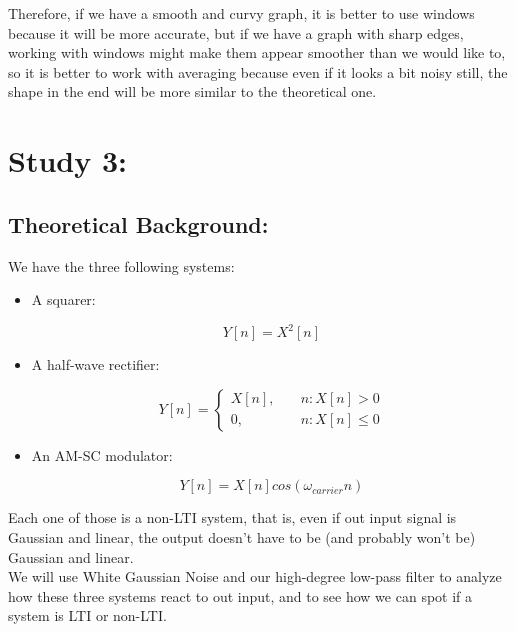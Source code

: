 \documentclass[a4paper,11pt]{article}
\begin{document}
Therefore, if we have a smooth and curvy graph, it is better to use windows
because it will be more accurate, but if we have a graph with sharp edges,
working with windows might make them appear smoother than we would like to,
so it is better to work with averaging because even if it looks a bit noisy
still, the shape in the end will be more similar to the theoretical one.

\newpage

\section{Study 3:}

\subsection{Theoretical Background:}

We have the three following systems:

\begin{itemize}

\item A squarer:

\begin{equation}\label{eq:Squarer}
  Y[n] = X^2[n]
\end{equation}

\item A half-wave rectifier:

\begin{equation}\label{eq:HW}
  Y[n] =
    \begin{cases}
        X[n], &\quad n: X[n] > 0\\
        0,    &\quad n: X[n] \leq 0
    \end{cases}
\end{equation}

\item An AM-SC modulator:

\begin{equation}\label{eq:AMSC}
  Y[n] = X[n]cos(\omega_{carrier} n)
\end{equation}

\end{itemize}

Each one of those is a non-LTI system, that is, even if out input signal is
Gaussian and linear, the output doesn't have to be (and probably won't be)
Gaussian and linear. \\

We will use White Gaussian Noise and our high-degree low-pass filter to analyze
how these three systems react to out input, and to see how we can spot if a
system is LTI or non-LTI.\\
\end{document}
